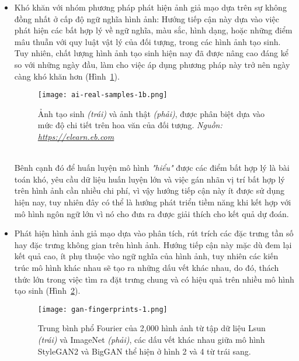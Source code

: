 \begin{itemize}
	\item Khó khăn với nhóm phương pháp phát hiện ảnh giả mạo dựa trên sự không đồng nhất ở cấp độ ngữ nghĩa hình ảnh: Hướng tiếp cận này dựa vào việc phát hiện các bất hợp lý về ngữ nghĩa, màu sắc, hình dạng, hoặc những điểm mâu thuẫn với quy luật vật lý của đối tượng, trong các hình ảnh tạo sinh. Tuy nhiên, chất lượng hình ảnh tạo sinh hiện nay đã được nâng cao đáng kể so với những ngày đầu, làm cho việc áp dụng phương pháp này trở nên ngày càng khó khăn hơn (Hình~\ref{fig:ai-real-samples-1b}).
	\begin{figure}[htp]
		\centering
		\texttt{[image: ai-real-samples-1b.png]}
		\begin{minipage}{0.9\linewidth}
			\caption{Ảnh tạo sinh \textit{(trái)} và ảnh thật \textit{(phải)}, được phân biệt dựa vào mức độ chi tiết trên hoa văn của đối tượng. \textit{Nguồn: \url{https://elearn.eb.com}}}
			\label{fig:ai-real-samples-1b}
		\end{minipage}
	\end{figure}\\
	Bênh cạnh đó để huấn luyện mô hình \textit{"hiểu"} được các điểm bất hợp lý là bài toán khó, yêu cầu dữ liệu huấn luyện lớn và việc gán nhãn vị trí bất hợp lý trên hình ảnh cần nhiều chi phí, vì vậy hướng tiếp cận này ít được sử dụng hiện nay, tuy nhiên đây có thể là hướng phát triển tiềm năng khi kết hợp với mô hình ngôn ngữ lớn vì nó cho đưa ra được giải thích cho kết quả dự đoán.
	\item Phát hiện hình ảnh giả mạo dựa vào phân tích, rút trích các đặc trưng tần số hay đặc trưng không gian trên hình ảnh. Hướng tiếp cận này mặc dù đem lại kết quả cao, ít phụ thuộc vào ngữ nghĩa của hình ảnh, tuy nhiên các kiến trúc mô hình khác nhau sẽ tạo ra những dấu vết khác nhau, do đó, thách thức lớn trong việc tìm ra đặt trưng chung và có hiệu quả trên nhiều mô hình tạo sinh (Hình~\ref{fig:gan-fingerprints-1}).
	
	\begin{figure}[htp]
		\centering
		\texttt{[image: gan-fingerprints-1.png]}
	    \vspace{10pt} %
	    
		\begin{minipage}{\linewidth}
			\caption{Trung bình phổ Fourier của 2,000 hình ảnh từ tập dữ liệu Lsun \textit{(trái)} và ImageNet \textit{(phải)}, các dấu vết khác nhau giữa mô hình StyleGAN2 và BigGAN thể hiện ở hình 2 và 4 từ trái sang.}
			\label{fig:gan-fingerprints-1}
		\end{minipage}
	\end{figure}
\end{itemize}
